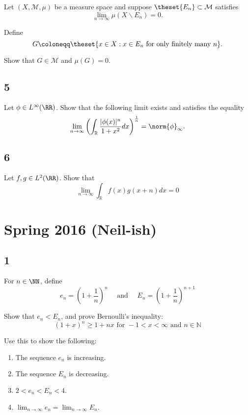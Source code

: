 Let \(( X, \mathcal{M}, \mu )\) be a measure space and suppose
\(\theset{E_n} \subset \mathcal M\) satisfies \[
\lim _{n \rightarrow \infty} \mu\left(X \backslash E_{n}\right)=0.
\]

Define \[
G \coloneqq \theset{x\in X : x \in E_n \text{ for only finitely many  } n}.
\]

Show that \(G \in \mathcal M\) and \(\mu(G) = 0\).

\hypertarget{section-4}{%
\subsection{5}\label{section-4}}

Let \(\phi\in L^\infty(\RR)\). Show that the following limit exists and
satisfies the equality \[
\lim _{n \rightarrow \infty}\left(\int_{\mathbb{R}} \frac{|\phi(x)|^{n}}{1+x^{2}} d x\right)^{\frac{1}{n}} = \norm{\phi}_\infty.
\]

\hypertarget{section-5}{%
\subsection{6}\label{section-5}}

Let \(f, g \in L^2(\RR)\). Show that \[
\lim _{n \rightarrow \infty} \int_{\mathbb{R}} f(x) g(x+n) d x=0
\]

\hypertarget{spring-2016-neil-ish}{%
\section{Spring 2016 (Neil-ish)}\label{spring-2016-neil-ish}}

\hypertarget{section}{%
\subsection{1}\label{section}}

For \(n\in \NN\), define \[
e_{n}=\left(1+\frac{1}{n}\right)^{n} 
\quad \text { and } \quad 
E_{n}=\left(1+\frac{1}{n}\right)^{n+1}
\]

Show that \(e_n < E_n\), and prove Bernoulli's inequality: \[
(1+x)^{n} \geq 1+n x \text { for }-1<x<\infty \text { and } n \in \mathbb{N}
\]

Use this to show the following:

\begin{enumerate}
\def\labelenumi{\arabic{enumi}.}
\tightlist
\item
  The sequence \(e_n\) is increasing.
\item
  The sequence \(E_n\) is decreasing.
\item
  \(2 < e_n < E_n < 4\).
\item
  \(\lim _{n \rightarrow \infty} e_{n}=\lim _{n \rightarrow \infty} E_{n}\).
\end{enumerate}

